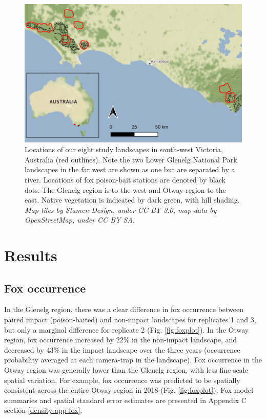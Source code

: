 \documentclass[11pt,a4paper,titlepage,twoside,openright]{style/unimelbthesis}
\begin{document}
\begin{mainmatter}
\(~\)

\(~\)
\begin{figure}

{\centering \includegraphics[width=1\linewidth]{figure/c3/fig1} 

}

\caption{Locations of our eight study landscapes in south-west Victoria, Australia (red outlines). Note the two Lower Glenelg National Park landscapes in the far west are shown as one but are separated by a river. Locations of fox poison-bait stations are denoted by black dots. The Glenelg region is to the west and Otway region to the east. Native vegetation is indicated by dark green, with hill shading. \textit{Map tiles by Stamen Design, under CC BY 3.0, map data by OpenStreetMap, under CC BY SA.}}\label{fig:density-map}
\end{figure}
\newpage

\hypertarget{results-3}{%
\section{Results}\label{results-3}}

\hypertarget{fox-occurrence}{%
\subsection{Fox occurrence}\label{fox-occurrence}}

In the Glenelg region, there was a clear difference in fox occurrence between paired impact (poison-baited) and non-impact landscapes for replicates 1 and 3, but only a marginal difference for replicate 2 (Fig. \ref{fig:foxplot}). In the Otway region, fox occurrence increased by 22\% in the non-impact landscape, and decreased by 43\% in the impact landscape over the three years (occurrence probability averaged at each camera-trap in the landscape). Fox occurrence in the Otway region was generally lower than the Glenelg region, with less fine-scale spatial variation. For example, fox occurrence was predicted to be spatially consistent across the entire Otway region in 2018 (Fig. \ref{fig:foxplot}). Fox model summaries and spatial standard error estimates are presented in Appendix C section \ref{density-app-fox}.


\end{mainmatter}
\end{document}
